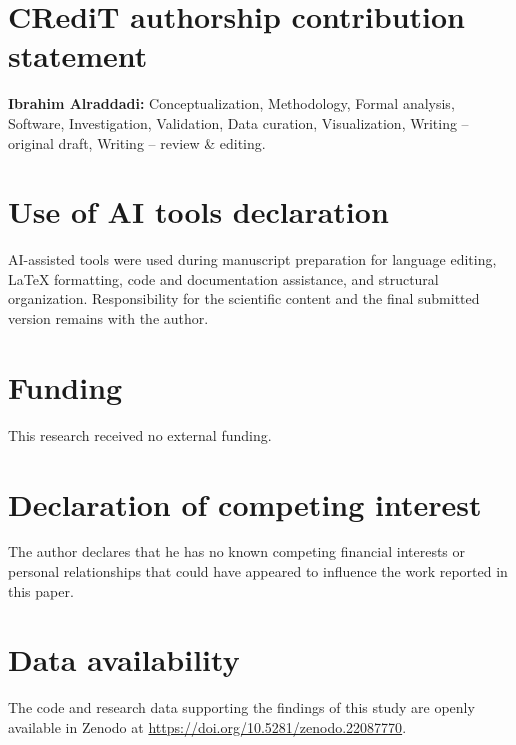 \documentclass[preprint,12pt]{elsarticle}
\numberwithin{equation}{section}
\theoremstyle{plain}
\theoremstyle{definition}
\theoremstyle{remark}
\begin{document}












\section*{CRediT authorship contribution statement}
\textbf{Ibrahim Alraddadi:} Conceptualization, Methodology, Formal analysis, Software, Investigation, Validation, Data curation, Visualization, Writing -- original draft, Writing -- review \& editing.

\section*{Use of AI tools declaration}
AI-assisted tools were used during manuscript preparation for language editing, LaTeX formatting, code and documentation assistance, and structural organization. Responsibility for the scientific content and the final submitted version remains with the author.

\section*{Funding}
This research received no external funding.

\section*{Declaration of competing interest}
The author declares that he has no known competing financial interests or personal relationships that could have appeared to influence the work reported in this paper.

\section*{Data availability}
The code and research data supporting the findings of this study are openly available in Zenodo at \url{https://doi.org/10.5281/zenodo.22087770}.



\end{document}
